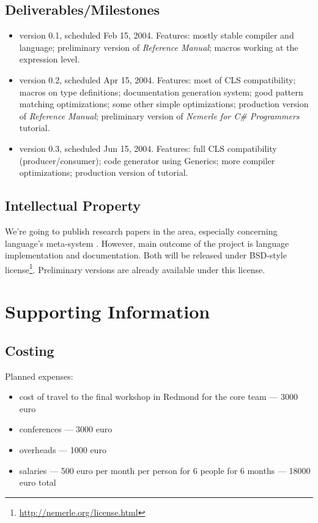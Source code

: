 \documentclass[a4paper,11pt]{article}
\begin{document}
\subsection{Deliverables/Milestones}
\begin{itemize}
\item version 0.1, scheduled Feb 15, 2004. Features:
  mostly stable compiler and language;
  preliminary version of \textit{Reference Manual}; 
  macros working at the expression level.

\item version 0.2, scheduled Apr 15, 2004. Features:
  most of CLS compatibility;
  macros on type definitions;
  documentation generation system;
  good pattern matching optimizations;
  some other simple optimizations;
  production version of \textit{Reference Manual};
  preliminary version of \textit{Nemerle for C\# Programmers} tutorial.
  
\item version 0.3, scheduled Jun 15, 2004. Features:
  full CLS compatibility (producer/consumer);
  code generator using Generics;
  more compiler optimizations;
  production version of tutorial.
\end{itemize}


\subsection{Intellectual Property}

We're going to publish research papers in the area, especially concerning
language's meta-system \cite{Macros}. However, main outcome of the project
is language implementation and documentation. Both will be released
under BSD-style license\footnote{\url{http://nemerle.org/license.html}}.
Preliminary versions are already available under this license.


\section{Supporting Information}


\subsection{Costing}

Planned expenses:

\begin{itemize}
  \item cost of travel to the final workshop 
    in Redmond for the core team --- 3000 euro
  \item conferences --- 3000 euro
  \item overheads --- 1000 euro
  \item salaries --- 500 euro per month per person
    for 6 people for 6 months --- 18000 euro total
\end{itemize}
\end{document}
